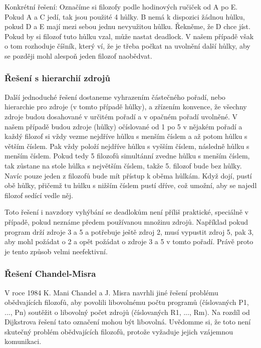 \documentclass{article}
\begin{document}
Konkrétní řešení: Označíme si filozofy podle hodinových ručiček od A po E. Pokud A a C jedí, tak jsou použité 4 hůlky. B nemá k dispozici žádnou hůlku, pokud D a E mají mezi sebou jednu nevyužitou hůlku. Řekněme, že D chce jíst. Pokud by si filozof tuto hůlku vzal, může nastat deadlock. V našem případě však o tom rozhoduje číšník, který ví, že je třeba počkat na uvolnění další hůlky, aby se později mohl alespoň jeden filozof naobědvat.


\subsubsection*{Řešení s hierarchií zdrojů}
Další jednoduché řešení dostaneme vyhrazením částečného pořadí, nebo hierarchie pro zdroje (v tomto případě hůlky), a zřízením konvence, že všechny zdroje budou dosahované v určitém pořadí a v opačném pořadí uvolněné. V našem případě budou zdroje (hůlky) očíslované od 1 po 5 v nějakém pořadí a každý filozof si vždy vezme nejdříve hůlku s menším číslem a až potom hůlku s větším číslem. Pak vždy položí nejdříve hůlku s vyšším číslem, následně hůlku s menším číslem. Pokud tedy 5 filozofů simultánní zvedne hůlku s menším číslem, tak zůstane na stole hůlka s největším číslem, takže 5. filozof bude bez hůlky. Navíc pouze jeden z filozofů bude mít přístup k oběma hůlkám. Když dojí, pustí obě hůlky, přičemž tu hůlku s nižším číslem pustí dříve, což umožní, aby se najedl filozof sedící vedle něj.

Toto řešení i navzdory vyhýbání se deadlokům není příliš praktické, speciálně v případě, pokud neznáme předem používanou množinu zdrojů. Například pokud program drží zdroje 3 a 5 a potřebuje ještě zdroj 2, musí vypustit zdroj 5, pak 3, aby mohl požádat o 2 a opět požádat o zdroje 3 a 5 v tomto pořadí. Právě proto je tento způsob velmi neefektivní.

\subsubsection*{Řešení Chandel-Misra}
V roce 1984 K. Mani Chandel a J. Misra navrhli jiné řešení problému obědvajících filozofů, aby povolili libovolnému počtu programů (číslovaných P1, ..., Pn) soutěžit o libovolný počet zdrojů (číslovaných R1, ..., Rm). Na rozdíl od Dijkstrova řešení tato označení mohou být libovolná. Uvědomme si, že toto není skutečný problém obědvajících filozofů, protože vyžaduje jejich vzájemnou komunikaci.
\end{document}
